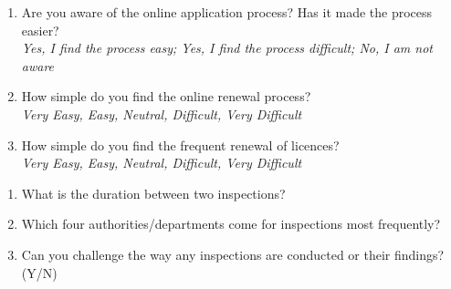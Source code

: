 \documentclass[a4paper, 12pt]{article}
\begin{document}
\begin{mdframed}[backgroundcolor=gray!20]
		\begin {enumerate}[nosep]
		\item Are you aware of the online application process? Has it made the process easier?\\
		\textit{Yes, I find the process easy; Yes, I find the process difficult; No, I am not aware}
		\item How simple do you find the online renewal process?\\
		\textit{Very Easy, Easy, Neutral, Difficult, Very Difficult}
		\item How simple do you find the frequent renewal of licences?\\
		\textit{Very Easy, Easy, Neutral, Difficult, Very Difficult}
		\end {enumerate}

		\begin {enumerate} [nosep]
		\item What is the duration between two inspections?
		\item Which four authorities/departments come for inspections most frequently?
		\item Can you challenge the way any inspections are conducted or their findings? (Y/N)
		\end {enumerate} 


\end{mdframed}
\end{document}
